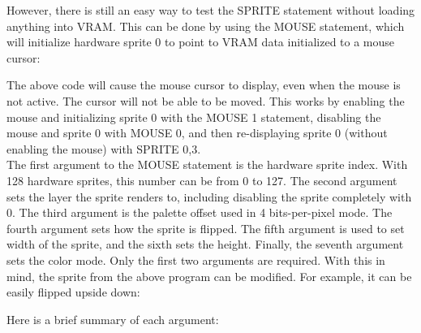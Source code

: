 However, there is still an easy way to test the {\ttfamily SPRITE} statement
without loading anything into VRAM.  This can be done by using the {\ttfamily
MOUSE} statement, which will initialize hardware sprite 0 to point to VRAM data
initialized to a mouse cursor:\\


The above code will cause the mouse cursor to display, even when the mouse is
not active.  The cursor will not be able to be moved.  This works by enabling
the mouse and initializing sprite 0 with the {\ttfamily MOUSE 1} statement,
disabling the mouse and sprite 0 with {\ttfamily MOUSE 0}, and then
re-displaying sprite 0 (without enabling the mouse) with {\ttfamily SPRITE
0,3}.\\

The first argument to the {\ttfamily MOUSE} statement is the hardware sprite
index.  With 128 hardware sprites, this number can be from 0 to 127.  The
second argument sets the layer the sprite renders to, including disabling the
sprite completely with 0.  The third argument is the palette offset used in 4
bits-per-pixel mode.  The fourth argument sets how the sprite is flipped.  The
fifth argument is used to set width of the sprite, and the sixth sets the
height.  Finally, the seventh argument sets the color mode.  Only the first two
arguments are required.  With this in mind, the sprite from the above program
can be modified.  For example, it can be easily flipped upside down:\\


Here is a brief summary of each argument:\\

